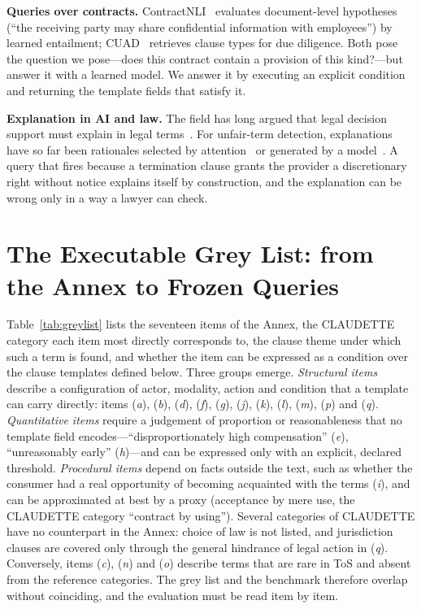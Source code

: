 \documentclass{IOS-Book-Article}
\newcommand{\corpus}{CLAUDETTE}
\newcommand{\gi}[1]{(\textit{#1})}
\begin{document}
\textbf{Queries over contracts.} ContractNLI~\cite{koreeda2021contractnli} evaluates document-level hypotheses (``the receiving party may share confidential information with employees'') by learned entailment; CUAD~\cite{hendrycks2021cuad} retrieves clause types for due diligence. Both pose the question we pose---does this contract contain a provision of this kind?---but answer it with a learned model. We answer it by executing an explicit condition and returning the template fields that satisfy it.

\textbf{Explanation in AI and law.} The field has long argued that legal decision support must explain in legal terms~\cite{atkinson2020explanation}. For unfair-term detection, explanations have so far been rationales selected by attention~\cite{ruggeri2022memory} or generated by a model~\cite{liepina2020claudettetool}. A query that fires because a termination clause grants the provider a discretionary right without notice explains itself by construction, and the explanation can be wrong only in a way a lawyer can check.

\section{The Executable Grey List: from the Annex to Frozen Queries}
\label{sec:greylist}
\label{sec:queries}
Table~\ref{tab:greylist} lists the seventeen items of the Annex, the \corpus{} category each item most directly corresponds to, the clause theme under which such a term is found, and whether the item can be expressed as a condition over the clause templates defined below. Three groups emerge. \emph{Structural items} describe a configuration of actor, modality, action and condition that a template can carry directly: items \gi{a}, \gi{b}, \gi{d}, \gi{f}, \gi{g}, \gi{j}, \gi{k}, \gi{l}, \gi{m}, \gi{p} and \gi{q}. \emph{Quantitative items} require a judgement of proportion or reasonableness that no template field encodes---``disproportionately high compensation'' \gi{e}, ``unreasonably early'' \gi{h}---and can be expressed only with an explicit, declared threshold. \emph{Procedural items} depend on facts outside the text, such as whether the consumer had a real opportunity of becoming acquainted with the terms \gi{i}, and can be approximated at best by a proxy (acceptance by mere use, the \corpus{} category ``contract by using''). Several categories of \corpus{} have no counterpart in the Annex: choice of law is not listed, and jurisdiction clauses are covered only through the general hindrance of legal action in \gi{q}. Conversely, items \gi{c}, \gi{n} and \gi{o} describe terms that are rare in ToS and absent from the reference categories. The grey list and the benchmark therefore overlap without coinciding, and the evaluation must be read item by item.
\end{document}
